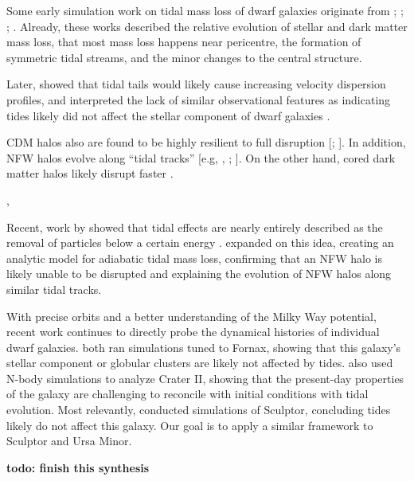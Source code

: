 Some early simulation work on tidal mass loss of dwarf galaxies
originate from \citet{oh+lin+aarseth1995}; \citet{piatek+pryor1995};
\citet{moore+davis1994}; \citet{johnston+spergel+hernquist1995}.
Already, these works described the relative evolution of stellar and
dark matter mass loss, that most mass loss happens near pericentre, the
formation of symmetric tidal streams, and the minor changes to the
central structure.

Later, \citet{read+2006} showed that tidal tails would likely cause
increasing velocity dispersion profiles, and interpreted the lack of
similar observational features as indicating tides likely did not affect
the stellar component of dwarf galaxies \citep[see
also][]{klimentowski+2009a}.

CDM halos also are found to be highly resilient to full disruption
{[}\citet{EP2020}; {]}. In addition, NFW halos evolve along ``tidal
tracks'' {[}e.g, \citet{PNM2008}, \citet{EN2021}; {]}. On the other
hand, cored dark matter halos likely disrupt faster
\citep[e.g.,][]{penarrubia+2010, errani+2023a}.

\citet{hayashi+2003}, \citet{green+vandenbosch2019}

Recent, work by
\citet{drakos+taylor+benson2020, drakos+taylor+benson2022, amorisco2021}
showed that tidal effects are nearly entirely described as the removal
of particles below a certain energy \citep[see
also][]{choi+weinberg+katz2009}. \citet{strucker+2023} expanded on this
idea, creating an analytic model for adiabatic tidal mass loss,
confirming that an NFW halo is likely unable to be disrupted and
explaining the evolution of NFW halos along similar tidal tracks.

With precise orbits and a better understanding of the Milky Way
potential, recent work continues to directly probe the dynamical
histories of individual dwarf galaxies.
\citet{borukhovetskaya+2022, dicintio+2024} both ran simulations tuned
to Fornax, showing that this galaxy's stellar component or globular
clusters are likely not affected by tides. \citet{borukhovetskaya+2022a}
also used N-body simulations to analyze Crater II, showing that the
present-day properties of the galaxy are challenging to reconcile with
\LCDM{} initial conditions with tidal evolution. Most relevantly,
\citet{iorio+2019} conducted simulations of Sculptor, concluding tides
likely do not affect this galaxy. Our goal is to apply a similar
framework to Sculptor and Ursa Minor.

\textbf{todo: finish this synthesis}

